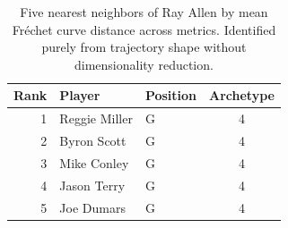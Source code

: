 \begin{table}[htbp]
  \centering\small
  \begin{tabular}{rllc}
    \toprule
    Rank & Player & Position & Archetype \\
    \midrule
    1 & Reggie Miller & G & 4 \\
    2 & Byron Scott & G & 4 \\
    3 & Mike Conley & G & 4 \\
    4 & Jason Terry & G & 4 \\
    5 & Joe Dumars & G & 4 \\
    \bottomrule
  \end{tabular}
  \caption{Five nearest neighbors of Ray Allen by mean Fr\'{e}chet curve distance across metrics. Identified purely from trajectory shape without dimensionality reduction.}
  \label{tab:Ray_Allen_frechet_curve_neighbors}
\end{table}

